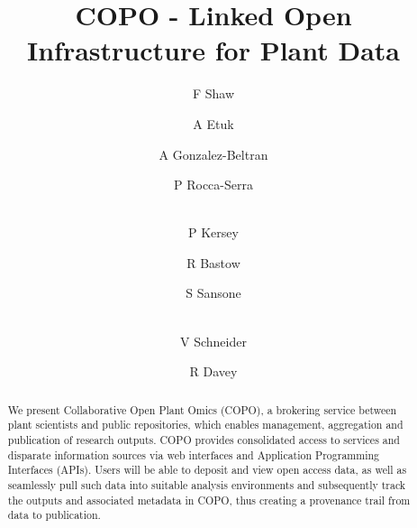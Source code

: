 \documentclass[runningheads,a4paper]{llncs}
\begin{document}
\mainmatter %

\title{COPO - Linked Open Infrastructure for Plant Data}


\author{F Shaw \and A Etuk \and A Gonzalez-Beltran\and P Rocca-Serra\and\\
  P  Kersey\and R Bastow\and S Sansone\and\\
  V Schneider\and R Davey}
%


%
%

 
\maketitle


\begin{abstract}
  We present Collaborative Open Plant Omics (COPO), a brokering
  service between plant scientists and public repositories, which
  enables management, aggregation and publication of research
  outputs. COPO provides consolidated access to services and disparate
  information sources via web interfaces and Application Programming
  Interfaces (APIs). Users will be able to deposit and view open
  access data, as well as seamlessly pull such data into suitable
  analysis environments and subsequently track the outputs and
  associated metadata in COPO, thus creating a provenance trail from
  data to publication.
\end{abstract}

\vspace*{-0.3in}
\end{document}

